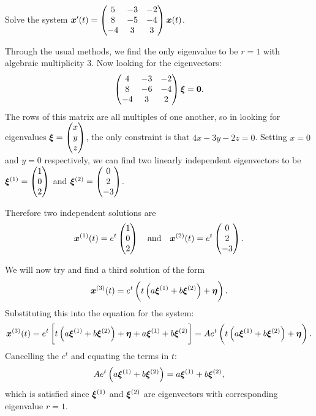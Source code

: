 \begin{eg}
	Solve the system $\bm{x}'(t) = \begin{pmatrix}5 & -3 & -2 \\ 8 & -5 & -4 \\ -4 & 3 & 3\end{pmatrix}\bm{x}(t)$.
	
	Through the usual methods, we find the only eigenvalue to be $r=1$ with algebraic multiplicity 3. Now looking for the eigenvectors:
	\[
	\begin{pmatrix}4 & -3 & -2 \\ 8 & -6 & -4 \\ -4 & 3 & 2\end{pmatrix}\bm{\xi} = \bm{0}.
	\]
	The rows of this matrix are all multiples of one another, so in looking for eigenvalues $\bm{\xi} = \begin{pmatrix}x \\ y \\z\end{pmatrix}$, the only constraint is that $4x-3y-2z = 0$. Setting $x=0$ and $y=0$ respectively, we can find two linearly independent eigenvectors to be $\bm{\xi}^{(1)} = \begin{pmatrix}1 \\ 0 \\ 2\end{pmatrix}$ and $\bm{\xi}^{(2)} = \begin{pmatrix}0 \\ 2 \\ -3\end{pmatrix}$.
	
	Therefore two independent solutions are
	\[
	\bm{x}^{(1)}(t) = e^t\begin{pmatrix}1 \\ 0 \\ 2\end{pmatrix} \quad \text{and} \quad \bm{x}^{(2)}(t) = e^t\begin{pmatrix}0 \\ 2 \\ -3\end{pmatrix}.
	\]
	
	We will now try and find a third solution of the form
	\[
	\bm{x}^{(3)}(t) = e^t\left(t\left(a\bm{\xi}^{(1)} + b\bm{\xi}^{(2)}\right) + \bm{\eta} \right).
	\]
	Substituting this into the equation for the system:
	\[
	\bm{x}^{(3)}(t) = e^t\left[t\left(a\bm{\xi}^{(1)} + b\bm{\xi}^{(2)}\right) + \bm{\eta} + a\bm{\xi}^{(1)} + b\bm{\xi}^{(2)}\right] = Ae^t\left(t\left(a\bm{\xi}^{(1)} + b\bm{\xi}^{(2)}\right) + \bm{\eta}\right).
	\]
	Cancelling the $e^t$ and equating the terms in $t$:
	\[
	Ae^t\left(a\bm{\xi}^{(1)} + b\bm{\xi}^{(2)}\right) = a\bm{\xi}^{(1)} + b\bm{\xi}^{(2)},
	\]
	which is satisfied since $\bm{\xi}^{(1)}$ and $\bm{\xi}^{(2)}$ are eigenvectors with corresponding eigenvalue $r=1$.
	

\end{eg}
